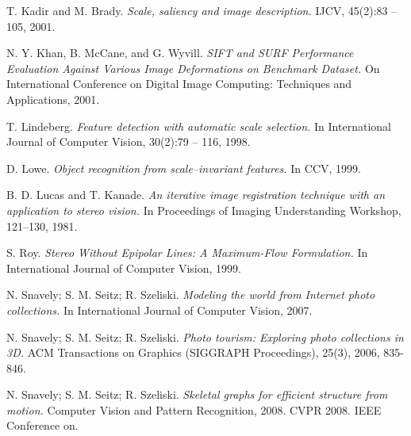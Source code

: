 \begin{thebibliography}{99}
  {\sc T. Kadir and M. Brady.} 
  \emph{Scale, saliency and image description.}
  IJCV, 45(2):83 – 105, 2001.

  {\sc N. Y. Khan, B. McCane, and G. Wyvill.} 
  \emph{SIFT and SURF Performance Evaluation Against Various Image Deformations on Benchmark Dataset.}
  On International Conference on Digital Image Computing: Techniques and Applications, 2001.

  
  {\sc T. Lindeberg.} 
  \emph{Feature detection with automatic scale selection.}
  In International Journal of Computer Vision, 30(2):79 – 116, 1998.

  {\sc D. Lowe.} 
  \emph{Object recognition from scale–invariant features.}
  In CCV, 1999.


  {\sc B. D. Lucas and T. Kanade. } 
  \emph{An iterative image registration technique with an application to stereo vision.}
  In Proceedings of Imaging Understanding Workshop, 121--130, 1981.

  {\sc S. Roy.} 
  \emph{Stereo Without Epipolar Lines: A Maximum-Flow Formulation.}
  In International Journal of Computer Vision, 1999.

  {\sc N. Snavely; S. M. Seitz; R. Szeliski.} 
  \emph{Modeling the world from Internet photo collections.}
  In International Journal of Computer Vision, 2007.

  {\sc N. Snavely; S. M. Seitz; R. Szeliski.} 
  \emph{Photo tourism: Exploring photo collections in 3D.}
  ACM Transactions on Graphics (SIGGRAPH Proceedings), 25(3), 2006, 835-846.

  {\sc N. Snavely; S. M. Seitz; R. Szeliski.} 
  \emph{Skeletal graphs for efficient structure from motion.}
  Computer Vision and Pattern Recognition, 2008. CVPR 2008. IEEE Conference on.



\end{thebibliography}
